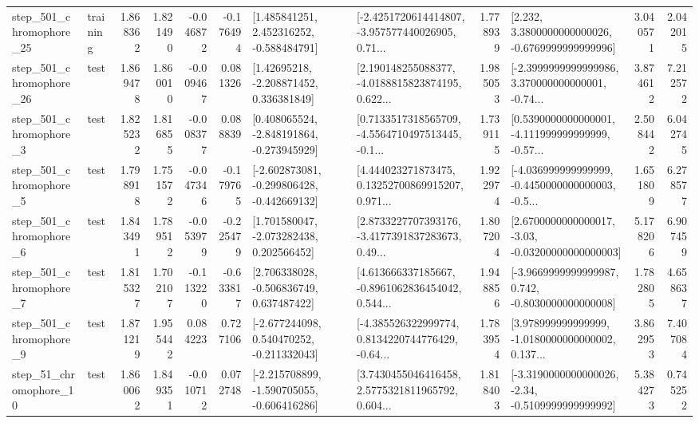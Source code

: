 \begin{tabular}{llrrrrllrlrr}
  step\_501\_chromophore\_25 &  training &      1.868362 &    1.821490 &     -0.046872 & -0.176494 &    [1.485841251, 2.452316252, -0.588484791] &  [-2.4251720614414807, -3.957577440026905, 0.71... &       1.778939 &   [2.232, 3.3800000000000026, -0.6769999999999996] &            3.040571 &          2.042015 \\
  step\_501\_chromophore\_26 &      test &      1.869478 &    1.860010 &     -0.009467 &  0.081326 &     [1.42695218, -2.208871452, 0.336381849] &  [2.190148255088377, -4.0188815823874195, 0.622... &       1.985053 &  [-2.3999999999999986, 3.370000000000001, -0.74... &            3.874612 &          7.212572 \\
   step\_501\_chromophore\_3 &      test &      1.825232 &    1.816855 &     -0.008377 &  0.088839 &   [0.408065524, -2.848191864, -0.273945929] &  [0.7133517318565709, -4.5564710497513445, -0.1... &       1.739115 &  [0.5390000000000001, -4.111999999999999, -0.57... &            2.508442 &          6.042745 \\
   step\_501\_chromophore\_5 &      test &      1.798918 &    1.751572 &     -0.047346 & -0.179765 &  [-2.602873081, -0.299806428, -0.442669132] &  [4.444023271873475, 0.13252700869915207, 0.971... &       1.922974 &  [-4.036999999999999, -0.4450000000000003, -0.5... &            1.651809 &          6.278577 \\
   step\_501\_chromophore\_6 &      test &      1.843491 &    1.789512 &     -0.053979 & -0.225479 &    [1.701580047, -2.073282438, 0.202566452] &  [2.8733227707393176, -3.4177391837283673, 0.49... &       1.807204 &  [2.6700000000000017, -3.03, -0.03200000000000003] &            5.178206 &          6.907459 \\
   step\_501\_chromophore\_7 &      test &      1.815327 &    1.702107 &     -0.113220 & -0.633817 &    [2.706338028, -0.506836749, 0.637487422] &  [4.613666337185667, -0.8961062836454042, 0.544... &       1.948856 &  [-3.9669999999999987, 0.742, -0.8030000000000008] &            1.782805 &          4.658637 \\
   step\_501\_chromophore\_9 &      test &      1.871219 &    1.955442 &      0.084223 &  0.727106 &   [-2.677244098, 0.540470252, -0.211332043] &  [-4.385526322999774, 0.8134220744776429, -0.64... &       1.783954 &  [3.978999999999999, -1.0180000000000002, 0.137... &            3.862953 &          7.407084 \\
   step\_51\_chromophore\_10 &      test &      1.860062 &    1.849351 &     -0.010712 &  0.072748 &  [-2.215708899, -1.590705055, -0.606416286] &  [3.7430455046416458, 2.5775321811965792, 0.604... &       1.818403 &  [-3.3190000000000026, -2.34, -0.5109999999999992] &            5.384273 &          0.745252 \\

\end{tabular}
